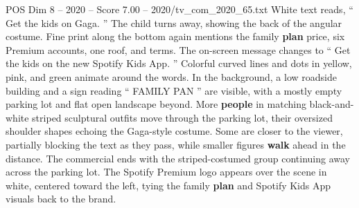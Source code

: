 \begin{textsample}{POS Dim 8 – 2020 – Score 7.00 – 2020/tv\_com\_2020\_65.txt}
White text reads, “ Get the kids on Gaga. ” The child turns away, showing the back of the angular costume.
Fine print along the bottom again mentions the family \textbf{plan} price, six Premium accounts, one roof, and terms.
The on-screen message changes to “ Get the kids on the new Spotify Kids App. ” Colorful curved lines and dots in yellow, pink, and green animate around the words.
In the background, a low roadside building and a sign reading “ FAMILY PAN ” are visible, with a mostly empty parking lot and flat open landscape beyond.
More \textbf{people} in matching black-and-white striped sculptural outfits move through the parking lot, their oversized shoulder shapes echoing the Gaga-style costume.
Some are closer to the viewer, partially blocking the text as they pass, while smaller figures \textbf{walk} ahead in the distance.
The commercial ends with the striped-costumed group continuing away across the parking lot.
The Spotify Premium logo appears over the scene in white, centered toward the left, tying the family \textbf{plan} and Spotify Kids App visuals back to the brand.

\end{textsample}
